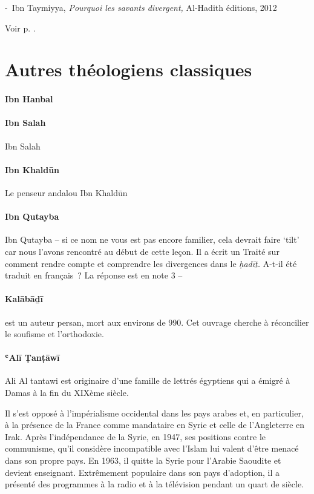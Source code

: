 -~Ibn Taymiyya, \emph{Pourquoi les savants divergent,} Al-Hadith
éditions, 2012


Voir p. \pageref{ibn-taymiyya}.

\section{Autres théologiens classiques}
\paragraph{Ibn Hanbal}

\pageref{Theol:IbnHanbal1}

\paragraph{Ibn Salah}
Ibn Salah
\pageref{Ibnsalah1}

\paragraph{Ibn Khaldūn}
Le penseur andalou Ibn Khaldūn \pageref{theol:IbnKhaldun} 

\paragraph{Ibn Qutayba}
Ibn Qutayba -- si ce nom ne vous est pas encore familier, cela devrait
faire `tilt' car nous l'avons rencontré au début de cette leçon. Il a
écrit un Traité sur comment rendre compte et comprendre les divergences
dans le \emph{ḥadīṯ.} A-t-il été traduit en français~? La réponse est en
note 3 --
\pageref{Theol:IbnQutayba1}

\paragraph{Kalābāḏī}
  est un auteur persan, mort aux environs de 990. Cet ouvrage
cherche à réconcilier le soufisme et l'orthodoxie. 
\pageref{theol:Kalabadi}


\paragraph{ʿAlī Ṭanṭāwī} \label{theo:AliAlTawani}
{Ali Al tantawi est originaire d'une
famille de lettrés égyptiens qui a émigré à Damas à la fin du XIXème
siècle.


Il s'est opposé à l'impérialisme occidental dans les pays
arabes et, en particulier, à la présence de la France comme mandataire
en Syrie et celle de l'Angleterre en Irak. Après l'indépendance de la
Syrie, en 1947, ses positions contre le communisme, qu'il considère
incompatible avec l'Islam lui valent d'être menacé dans son propre pays.
En 1963, il quitte la Syrie pour l'Arabie Saoudite et devient
enseignant.
Extrêmement populaire dans son pays d'adoption, il a
présenté des programmes à la radio et à la télévision pendant un quart
de
siècle.}


